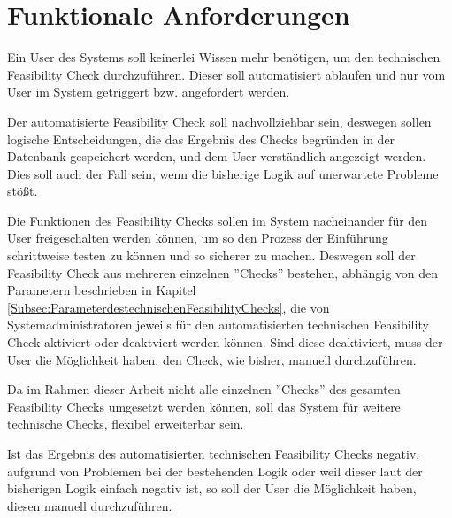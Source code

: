 \section{Funktionale Anforderungen}
Ein User des Systems soll keinerlei Wissen mehr benötigen, um den technischen Feasibility Check durchzuführen. Dieser soll automatisiert ablaufen und nur vom User im System getriggert bzw. angefordert werden.

Der automatisierte Feasibility Check soll nachvollziehbar sein, deswegen sollen logische Entscheidungen, die das Ergebnis des Checks begründen in der Datenbank gespeichert werden, und dem User verständlich angezeigt werden. Dies soll auch der Fall sein, wenn die bisherige Logik auf unerwartete Probleme stößt.

Die Funktionen des Feasibility Checks sollen im System nacheinander für den User freigeschalten werden können, um so den Prozess der Einführung schrittweise testen zu können und so sicherer zu machen.
Deswegen soll der Feasibility Check aus mehreren einzelnen ''Checks'' bestehen, abhängig von den Parametern beschrieben in Kapitel \ref{Subsec:ParameterdestechnischenFeasibilityChecks}, die von Systemadministratoren jeweils für den automatisierten technischen Feasibility Check aktiviert oder deaktviert werden können. Sind diese deaktiviert, muss der User die Möglichkeit haben, den Check, wie bisher, manuell durchzuführen.

Da im Rahmen dieser Arbeit nicht alle einzelnen ''Checks'' des gesamten Feasibility Checks umgesetzt werden können, soll das System für weitere technische Checks, flexibel erweiterbar sein.

Ist das Ergebnis des automatisierten technischen Feasibility Checks negativ, aufgrund von Problemen bei der bestehenden Logik oder weil dieser laut der bisherigen Logik einfach negativ ist, so soll der User die Möglichkeit haben, diesen manuell durchzuführen.


